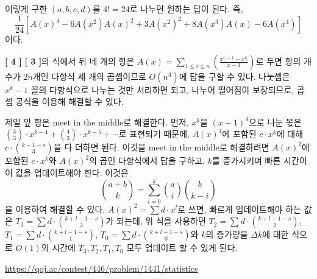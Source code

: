 \begin{hint}
    이렇게 구한 $(a, b, c, d)$를 $4!=24$로 나누면 원하는 답이 된다. 즉,
    $$\frac{1}{24}\left[A(x)^4 - 6A(x^2)A(x)^2 + 3A(x^2)^2 + 8A(x^3)A(x) - 6A(x^4)\right]$$
    이다.

    \textbf{[ 4 ]}
    \textbf{[ 3 ]}의 식에서 뒤 네 개의 항은 $A(x) = \sum_{1 \leq i \leq n} {\left(\frac{x^{r_i+1} - x^{l_i}}{x-1}\right)}$로 두면 항의 개수가 $2n$개인 다항식 세 개의 곱셈이므로 $O(n^3)$에 답을 구할 수 있다. 나눗셈은 $x^k-1$ 꼴의 다항식으로 나누는 것만 처리하면 되고, 나누어 떨어짐이 보장되므로, 곱셈 공식을 이용해 해결할 수 있다.

    제일 앞 항은 meet in the middle로 해결한다. 먼저, $x^k$을 $(x-1)^4$으로 나눈 몫은 $\binom{3}{3} \cdot x^{k-4} + \binom{4}{3} \cdot x^{k-5} + \cdots$로 표현되기 때문에, $A(x)^4$에 포함된 $c \cdot x^k$에 대해 $c \cdot \binom{k-1-s}{3}$을 다 더하면 된다. 이것을 meet in the middle로 해결하려면 $A(x)^2$에 포함된 $c \cdot x^k$와 $A(x)^2$의 곱인 다항식에서 답을 구하고, $k$를 증가시키며 빠른 시간이 이 값을 업데이트해야 한다. 이것은 
    $$\binom{a+b}{k} = \sum_{i=0}^k {\binom{a}{i}\binom{b}{k-i}}$$
    을 이용하여 해결할 수 있다. $A(x)^2 = \sum d \cdot x^l$로 쓰면, 빠르게 업데이트해야 하는 값은 $T_3 = \sum d \cdot \binom{k+l-1-s}{3}$가 되는데, 위 식을 사용하면 $T_2 = \sum d \cdot \binom{k+l-1-s}{2}$, $T_1 = \sum d \cdot \binom{k+l-1-s}{1}$, $T_0 = \sum d \cdot \binom{k+l-1-s}{0}$와 $k$의 증가량을 $\Delta k$에 대한 식으로 $O(1)$의 시간에 $T_3, T_2, T_1, T_0$ 모두 업데이트 할 수 있게 된다.
\end{hint}

\begin{hint}
    \url{https://qoj.ac/contest/446/problem/1441/statistics}
\end{hint}
